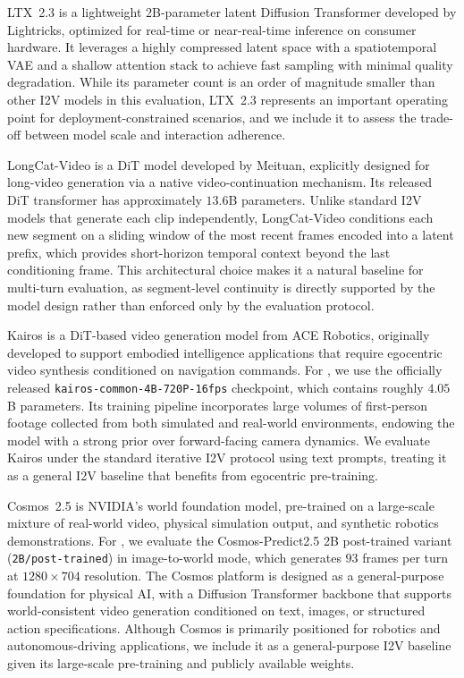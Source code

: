 LTX~2.3 is a lightweight 2B-parameter latent Diffusion Transformer developed by Lightricks, optimized for real-time or near-real-time inference on consumer hardware.
It leverages a highly compressed latent space with a spatiotemporal VAE and a shallow attention stack to achieve fast sampling with minimal quality degradation.
While its parameter count is an order of magnitude smaller than other I2V models in this evaluation, LTX~2.3 represents an important operating point for deployment-constrained scenarios, and we include it to assess the trade-off between model scale and interaction adherence.

LongCat-Video is a DiT model developed by Meituan, explicitly designed for long-video generation via a native video-continuation mechanism.
Its released DiT transformer has approximately $13.6$B parameters.
Unlike standard I2V models that generate each clip independently, LongCat-Video conditions each new segment on a sliding window of the most recent frames encoded into a latent prefix, which provides short-horizon temporal context beyond the last conditioning frame.
This architectural choice makes it a natural baseline for multi-turn evaluation, as segment-level continuity is directly supported by the model design rather than enforced only by the evaluation protocol.

Kairos is a DiT-based video generation model from ACE Robotics, originally developed to support embodied intelligence applications that require egocentric video synthesis conditioned on navigation commands.
For \benchmark, we use the officially released \texttt{kairos-common-4B-720P-16fps} checkpoint, which contains roughly $4.05$B parameters.
Its training pipeline incorporates large volumes of first-person footage collected from both simulated and real-world environments, endowing the model with a strong prior over forward-facing camera dynamics.
We evaluate Kairos under the standard iterative I2V protocol using text prompts, treating it as a general I2V baseline that benefits from egocentric pre-training.

Cosmos~2.5 is NVIDIA's world foundation model, pre-trained on a large-scale mixture of real-world video, physical simulation output, and synthetic robotics demonstrations.
For \benchmark, we evaluate the Cosmos-Predict2.5 2B post-trained variant (\texttt{2B/post-trained}) in image-to-world mode, which generates $93$ frames per turn at $1280\times704$ resolution.
The Cosmos platform is designed as a general-purpose foundation for physical AI, with a Diffusion Transformer backbone that supports world-consistent video generation conditioned on text, images, or structured action specifications.
Although Cosmos is primarily positioned for robotics and autonomous-driving applications, we include it as a general-purpose I2V baseline given its large-scale pre-training and publicly available weights.

